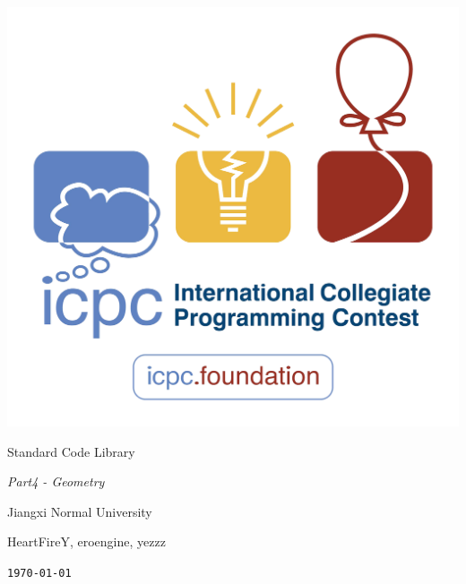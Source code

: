 \documentclass{article}
\begin{document}
\pagestyle{empty}
\begin{center}

    \includegraphics[width=.7\linewidth]{ICPC.png}
    
    \vspace{5em}
    
    \Huge{{Standard Code Library}}
    
    \vspace{2em}
    
    \huge{\textit{Part4 - Geometry}}
    
    \vspace{2em}
    
    \Large{\textsf{Jiangxi Normal University}}
    
    \vspace{0.4em}
    
    \Large{\textsf{HeartFireY, eroengine, yezzz}}
    
    \vspace{0.6em}
    
    \texttt{\today}
    
\end{center}
\end{document}
